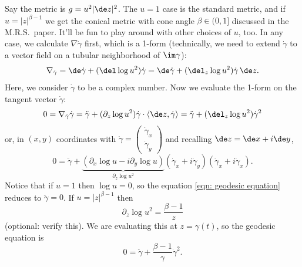 \documentclass{article}
\begin{document}
Say the metric is $g=u^2|\de z|^2$.  The $u=1$ case is the standard metric, and if $u=|z|^{\beta-1}$ we get the conical metric with cone angle $\beta\in(0,1]$ discussed in the M.R.S.\ paper.  It'll be fun to play around with other choices of $u$, too.  In any case, we calculate $\nabla{\dot\gamma}$ first, which is a 1-form (technically, we need to extend $\dot\gamma$ to a vector field on a tubular neighborhood of $\im\gamma$):
\begin{equation}
    \nabla_{\dot\gamma}=\de\dot\gamma+(\del\log u^2)\dot\gamma=\de\dot\gamma+(\del_z\log u^2)\dot\gamma\,\de z.
\end{equation}
Here, we consider $\dot\gamma$ to be a complex number.  Now we evaluate the 1-form on the tangent vector $\dot\gamma$:
\begin{equation}\label{eqn: geodesic equation}
    0=\nabla_{\dot\gamma}\dot\gamma=\ddot\gamma+(\partial_z\log u^2)\dot\gamma\cdot\langle\de z,\dot\gamma\rangle=\ddot\gamma+(\del_z\log u^2)\dot\gamma^2
\end{equation}
or, in $(x,y)$ coordinates with $\dot\gamma=\left(\begin{smallmatrix}\dot\gamma_x\\\dot\gamma_y\end{smallmatrix}\right)$ and recalling $\de z=\de x+i\de y$,
\begin{equation}\label{eqn: geodesic equation in x y}
    0=\ddot\gamma+\underbrace{(\partial_x\log u-i\partial_y\log u)}_{\partial_z\log u^2}(\dot\gamma_x+i\dot\gamma_y)(\dot\gamma_x+i\dot\gamma_x).
\end{equation}
Notice that if $u=1$ then $\log u=0$, so the equation \eqref{eqn: geodesic equation} reduces to $\ddot\gamma=0$.  If $u=|z|^{\beta-1}$ then
    $$\partial_z\log u^2
    =\frac{\beta-1}z$$
(optional: verify this).  We are evaluating this at $z=\gamma(t)$, so the geodesic equation is
\begin{equation}\label{eqn: conical geodesic equation}
    0=\ddot\gamma+\frac{\beta-1}\gamma\dot\gamma^2.
\end{equation}
\end{document}
